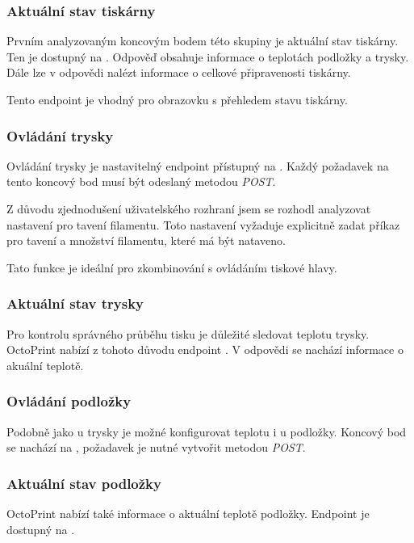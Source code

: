 \subsubsection*{Aktuální stav tiskárny}

Prvním analyzovaným koncovým bodem této skupiny je aktuální stav tiskárny.
Ten je dostupný na .
Odpověď obsahuje informace o teplotách podložky a trysky.
Dále lze v odpovědi nalézt informace o celkové připravenosti tiskárny.

Tento endpoint je vhodný pro obrazovku s přehledem stavu tiskárny.

\subsubsection*{Ovládání trysky}

Ovládání trysky je nastavitelný endpoint přístupný na .
Každý požadavek na tento koncový bod musí být odeslaný metodou \textit{POST}.

Z důvodu zjednodušení uživatelského rozhraní jsem se rozhodl analyzovat nastavení pro tavení filamentu.
Toto nastavení vyžaduje explicitně zadat příkaz pro tavení a množství filamentu, které má být nataveno.

Tato funkce je ideální pro zkombinování s ovládáním tiskové hlavy.

\subsubsection*{Aktuální stav trysky}

Pro kontrolu správného průběhu tisku je důležité sledovat teplotu trysky.
OctoPrint nabízí z tohoto důvodu endpoint .
V odpovědi se nachází informace o akuální teplotě.

\subsubsection*{Ovládání podložky}

Podobně jako u trysky je možné konfigurovat teplotu i u podložky.
Koncový bod se nachází na , požadavek je nutné vytvořit metodou \textit{POST}.

\subsubsection*{Aktuální stav podložky}

OctoPrint nabízí také informace o aktuální teplotě podložky.
Endpoint je dostupný na .

